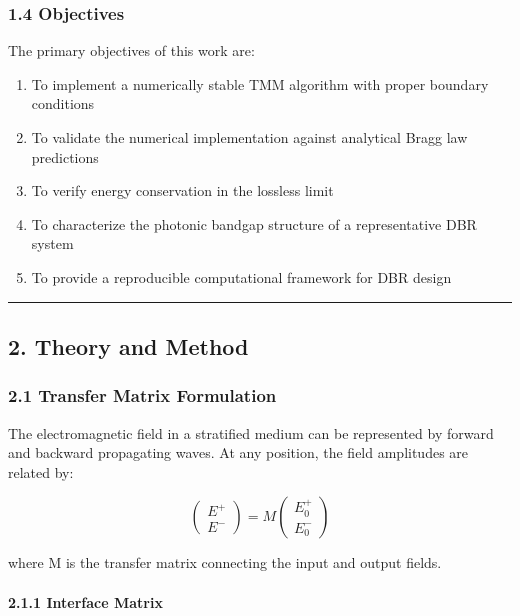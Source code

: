 \documentclass[
]{article}
\providecommand{\tightlist}{%
  \setlength{\itemsep}{0pt}\setlength{\parskip}{0pt}}
\begin{document}
\subsubsection{1.4 Objectives}\label{objectives}

The primary objectives of this work are:

\begin{enumerate}
\def\labelenumi{\arabic{enumi}.}
\tightlist
\item
  To implement a numerically stable TMM algorithm with proper boundary
  conditions
\item
  To validate the numerical implementation against analytical Bragg law
  predictions
\item
  To verify energy conservation in the lossless limit
\item
  To characterize the photonic bandgap structure of a representative DBR
  system
\item
  To provide a reproducible computational framework for DBR design
\end{enumerate}

\begin{center}\rule{0.5\linewidth}{0.5pt}\end{center}

\subsection{2. Theory and Method}\label{theory-and-method}

\subsubsection{2.1 Transfer Matrix
Formulation}\label{transfer-matrix-formulation}

The electromagnetic field in a stratified medium can be represented by
forward and backward propagating waves. At any position, the field
amplitudes are related by:

\[\begin{pmatrix} E^+ \\ E^- \end{pmatrix} = M \begin{pmatrix} E^+_0 \\ E^-_0 \end{pmatrix}\]

where M is the transfer matrix connecting the input and output fields.

\paragraph{2.1.1 Interface Matrix}\label{interface-matrix}
\end{document}
